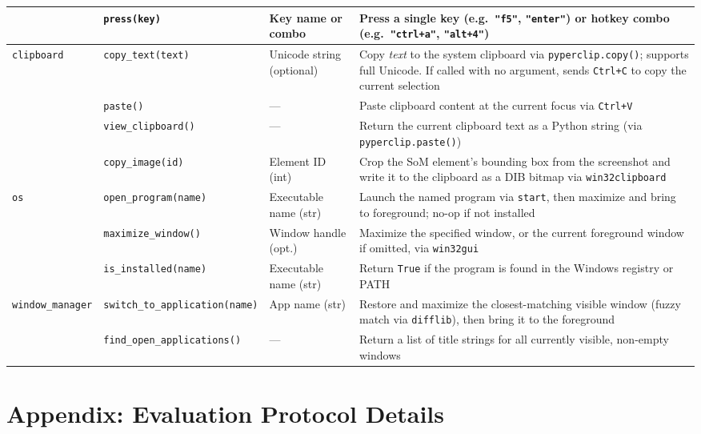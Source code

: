 \documentclass{article}
\begin{document}
\begin{table}[h]
{\begin{tabular}{lllp{6cm}}
  & \texttt{press(key)}        & Key name or combo           & Press a single key (e.g.\ \texttt{"f5"}, \texttt{"enter"}) or hotkey combo (e.g.\ \texttt{"ctrl+a"}, \texttt{"alt+4"}) \\
\midrule
\multirow{4}{*}{\texttt{clipboard}}
  & \texttt{copy\_text(text)}  & Unicode string (optional)   & Copy \textit{text} to the system clipboard via \texttt{pyperclip.copy()}; supports full Unicode. If called with no argument, sends \texttt{Ctrl+C} to copy the current selection \\
  & \texttt{paste()}           & —                           & Paste clipboard content at the current focus via \texttt{Ctrl+V} \\
  & \texttt{view\_clipboard()} & —                           & Return the current clipboard text as a Python string (via \texttt{pyperclip.paste()}) \\
  & \texttt{copy\_image(id)}   & Element ID (int)            & Crop the SoM element's bounding box from the screenshot and write it to the clipboard as a DIB bitmap via \texttt{win32clipboard} \\
\midrule
\multirow{3}{*}{\texttt{os}}
  & \texttt{open\_program(name)}    & Executable name (str) & Launch the named program via \texttt{start}, then maximize and bring to foreground; no-op if not installed \\
  & \texttt{maximize\_window()}     & Window handle (opt.)  & Maximize the specified window, or the current foreground window if omitted, via \texttt{win32gui} \\
  & \texttt{is\_installed(name)}    & Executable name (str) & Return \texttt{True} if the program is found in the Windows registry or PATH \\
\midrule
\multirow{2}{*}{\texttt{window\_manager}}
  & \texttt{switch\_to\_application(name)} & App name (str) & Restore and maximize the closest-matching visible window (fuzzy match via \texttt{difflib}), then bring it to the foreground \\
  & \texttt{find\_open\_applications()}    & —              & Return a list of title strings for all currently visible, non-empty windows \\
\bottomrule
\end{tabular}%
}
\end{table}

\section*{Appendix: Evaluation Protocol Details}
\end{document}
